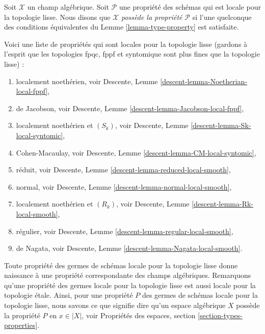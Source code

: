 \begin{definition}
\label{definition-type-property}
Soit $\mathcal{X}$ un champ algébrique.
Soit $\mathcal{P}$ une propriété des schémas qui est
locale pour la topologie lisse.
Nous disons que $\mathcal{X}$ {\it possède la propriété $\mathcal{P}$}
si l'une quelconque des conditions équivalentes du
Lemme \ref{lemma-type-property}
est satisfaite.
\end{definition}

\begin{remark}
\label{remark-list-properties-local-smooth-topology}
Voici une liste de propriétés qui sont locales pour la topologie lisse
(gardons à l'esprit que les topologies fpqc, fppf et syntomique sont
plus fines que la topologie lisse) :
\begin{enumerate}
\item localement noethérien, voir
Descente, Lemme \ref{descent-lemma-Noetherian-local-fppf},
\item de Jacobson, voir
Descente, Lemme \ref{descent-lemma-Jacobson-local-fppf},
\item localement noethérien et $(S_k)$, voir
Descente, Lemme \ref{descent-lemma-Sk-local-syntomic},
\item Cohen-Macaulay, voir
Descente, Lemme \ref{descent-lemma-CM-local-syntomic},
\item réduit, voir
Descente, Lemme \ref{descent-lemma-reduced-local-smooth},
\item normal, voir
Descente, Lemme \ref{descent-lemma-normal-local-smooth},
\item localement noethérien et $(R_k)$, voir
Descente, Lemme \ref{descent-lemma-Rk-local-smooth},
\item régulier, voir
Descente, Lemme \ref{descent-lemma-regular-local-smooth},
\item de Nagata, voir
Descente, Lemme \ref{descent-lemma-Nagata-local-smooth}.
\end{enumerate}
\end{remark}

\noindent
Toute propriété des germes de schémas locale pour la topologie lisse donne naissance à une
propriété correspondante des champs algébriques. Remarquons qu'une propriété des germes locale pour la topologie lisse
est aussi locale pour la topologie \'etale. Ainsi, pour une propriété $P$ des germes de
schémas locale pour la topologie lisse, nous savons ce que signifie dire qu'un espace algébrique $X$ possède
la propriété $P$ en $x \in |X|$, voir
Propriétés des espaces, section \ref{section-types-properties}.

